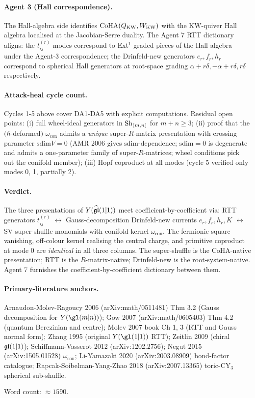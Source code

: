 \paragraph{Agent 3 (Hall correspondence).} The Hall-algebra side
identifies $\mathrm{CoHA}(Q_{\mathrm{KW}}, W_{\mathrm{KW}})$ with the KW-quiver
Hall algebra localised at the Jacobian-Serre duality. The Agent 7 RTT
dictionary aligns: the $t^{(r)}_{ij}$ modes correspond to Ext$^1$ graded
pieces of the Hall algebra under the Agent-3 correspondence; the
Drinfeld-new generators $e_r, f_r, h_r$ correspond to spherical
Hall generators at root-space grading $\alpha + r\delta,
-\alpha + r\delta, r\delta$ respectively.

\paragraph{Attack-heal cycle count.} Cycles 1-5 above cover DA1-DA5
with explicit computations. Residual open points: (i) full wheel-ideal
generators in $\mathrm{Sh}_{(m,n)}$ for $m+n \geq 3$; (ii) proof that the
$(\hbar$-deformed$)$ $\omega_{\mathrm{con}}$ admits a \emph{unique}
super-$R$-matrix presentation with crossing parameter $\mathrm{sdim}V=0$
(AMR 2006 gives $\mathrm{sdim}$-dependence; $\mathrm{sdim}=0$ is degenerate
and admits a one-parameter family of super-$R$-matrices; wheel conditions
pick out the conifold member);
(iii) Hopf coproduct at all modes (cycle 5 verified only modes 0, 1,
partially 2).

\paragraph{Verdict.} The three presentations of $Y(\widehat{\mathfrak{gl}}(1|1))$
meet coefficient-by-coefficient via: RTT generators $t^{(r)}_{ij}$
$\leftrightarrow$ Gauss-decomposition Drinfeld-new currents $e_r, f_r,
h_r, K$ $\leftrightarrow$ SV super-shuffle monomials with conifold
kernel $\omega_{\mathrm{con}}$. The fermionic square vanishing,
off-colour kernel realising the central charge, and primitive coproduct
at mode $0$ are \emph{identical} in all three columns. The super-shuffle
is the CoHA-native presentation; RTT is the $R$-matrix-native;
Drinfeld-new is the root-system-native. Agent 7 furnishes the
coefficient-by-coefficient dictionary between them.

\paragraph{Primary-literature anchors.}
Arnaudon-Molev-Ragoucy 2006 (arXiv:math/0511481) Thm 3.2 (Gauss
decomposition for $Y(\gl(m|n))$); Gow 2007 (arXiv:math/0605403) Thm 4.2
(quantum Berezinian and centre); Molev 2007 book Ch 1, 3 (RTT and
Gauss normal form); Zhang 1995 (original $Y(\gl(1|1))$ RTT); Zeitlin
2009 (chiral $\mathfrak{gl}(1|1)$); Schiffmann-Vasserot 2012 (arXiv:1202.2756);
Negut 2015 (arXiv:1505.01528) $\omega_{\mathrm{con}}$; Li-Yamazaki
2020 (arXiv:2003.08909) bond-factor catalogue; Rapcak-Soibelman-Yang-Zhao
2018 (arXiv:2007.13365) toric-CY$_3$ spherical sub-shuffle.

Word count: $\approx 1590$.
